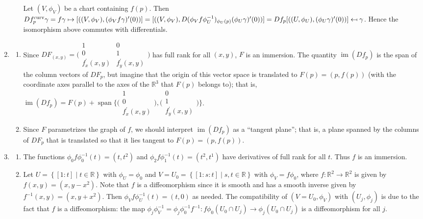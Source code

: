 \documentclass[11pt,leqno]{article}
\theoremstyle{plain}
\theoremstyle{definition}
\numberwithin{equation}{section}
\numberwithin{lem}{section}
\newcommand{\cbr}[1]{\left\{#1\right\}}
\DeclareMathOperator{\Span}{span}
\DeclareMathOperator{\im}{im}
\newcommand\mapsfrom{\mathrel{\reflectbox{\ensuremath{\mapsto}}}}
\begin{document}
\begin{enumerate}
\begin{enumerate}
      \sloppy Let $(V,\phi_V)$ be a chart containing $f(p)$. Then $Df_p^{\mathrm{curv}}\gamma = f\gamma \mapsto [((V,\phi_V),(\phi_Vf\gamma)^\prime(0))] = [((V,\phi_V),D(\phi_Vf\phi_U^{-1})_{\phi_U(p)}(\phi_U\gamma)^\prime(0))] = Df_p[((U,\phi_U),(\phi_U\gamma)^\prime(0))] \mapsfrom \gamma$. Hence the isomorphism above commutes with differentials.
    \end{enumerate}
    \item \begin{enumerate}
      \item Since $DF_{(x,y)} = \Big(\!\begin{smallmatrix}
        1 & 0 \\
        0 & 1 \\ 
        f^\prime_x(x,y) & f^\prime_y(x,y)
      \end{smallmatrix}\!\Big)$ has full rank for all $(x,y)$, $F$ is an immersion. The quantity $\im(Df_p)$ is the span of the column vectors of $DF_p$, but imagine that the origin of this vector space is translated to $F(p) = (p,f(p))$ (with the coordinate axes parallel to the axes of the $\mathbb R^3$ that $F(p)$ belongs to); that is, $\im (Df_p) = F(p) + \Span\Big\{\Big(\!\begin{smallmatrix}
        1  \\
        0  \\ 
        f^\prime_x(x,y) 
      \end{smallmatrix}\!\Big), \Big(\!\begin{smallmatrix}
         0 \\
         1 \\ 
         f^\prime_y(x,y)
      \end{smallmatrix}\!\Big)\Big\}$.
      \item Since $F$ parametrizes the graph of $f$, we should interpret $\im(Df_p)$ as a ``tangent plane''; that is, a plane spanned by the columns of $DF_p$ that is translated so that it lies tangent to $F(p) = (p,f(p))$.
    \end{enumerate}
    \item \begin{enumerate}
      \item The functions $\phi_0f\phi_0^{-1}(t)=
      (t,t^2)$ and $\phi_2f\phi_1^{-1}(t)=(t^2,t^1)$ have derivatives of full rank for all $t$. Thus $f$ is an immersion.
      \item Let $U = \cbr{[1:t]\mid t\in \mathbb R}$ with $\phi_U = \phi_0$ and $V = U_0 = \cbr{[1:s:t]\mid s,t\in\mathbb R}$ with $\phi_V = f\phi_0$, where $f\colon\mathbb R^2\to\mathbb R^2$ is given by $f(x,y) = (x,y-x^2)$. Note that $f$ is a diffeomorphism since it is smooth and has a smooth inverse given by $f^{-1}(x,y) = (x,y+x^2)$. Then $\phi_Vf\phi_U^{-1}(t) = (t,0)$ as needed. The compatibility of $(V = U_0,\phi_V)$ with $(U_j,\phi_j)$ is due to the fact that $f$ is a diffeomorphism: the map $\phi_{j}\phi_{V}^{-1} = \phi_j\phi_0^{-1}f^{-1}\colon f\phi_0(U_0\cap U_j)\to \phi_j(U_0\cap U_j)$ is a diffeomorphism for all $j$.

\end{enumerate}
\end{enumerate}
\end{document}
